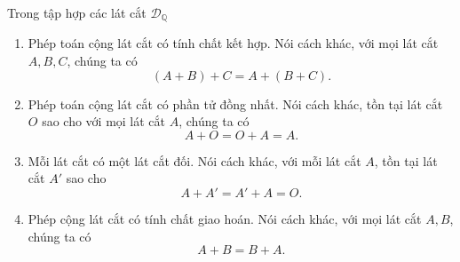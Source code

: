 \begin{theorem}\label{theorem:properties-of-dedekind-cuts-addition}
    Trong tập hợp các lát cắt $\mathscr{D}_{\mathbb{Q}}$
    \begin{enumerate}[label={(\roman*)}]
        \item Phép toán cộng lát cắt có tính chất kết hợp. Nói cách khác, với mọi lát cắt $A, B, C$, chúng ta có
              \[
                  (A + B) + C = A + (B + C).
              \]
        \item Phép toán cộng lát cắt có phần tử đồng nhất. Nói cách khác, tồn tại lát cắt $O$ sao cho với mọi lát cắt $A$, chúng ta có
              \[
                  A + O = O + A = A.
              \]
        \item Mỗi lát cắt có một lát cắt đối. Nói cách khác, với mỗi lát cắt $A$, tồn tại lát cắt $A'$ sao cho
              \[
                  A + A' = A' + A = O.
              \]
        \item Phép cộng lát cắt có tính chất giao hoán. Nói cách khác, với mọi lát cắt $A, B$, chúng ta có
              \[
                  A + B = B + A.
              \]
    \end{enumerate}
\end{theorem}

